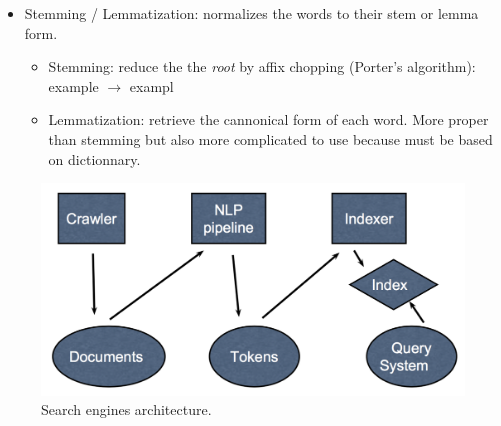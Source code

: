 \begin{itemize}
	\item Stemming / Lemmatization: normalizes the words to their stem or lemma form.
	\begin{itemize}
		\item Stemming: reduce the the {\it root} by affix chopping (Porter's algorithm): example $\rightarrow$ exampl
		\item Lemmatization: retrieve the cannonical form of each word. More proper than stemming but also more complicated to use because must be based on dictionnary.
	\end{itemize}

\end{itemize}

\begin{figure}[H]%
 \centering
 \includegraphics[width=13cm]{./img/11/SE_architecture}
 \caption{\label{pic:SE_pipline} Search engines architecture.}
\end{figure}



























